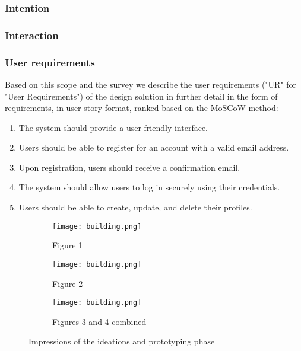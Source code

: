 \subsubsection{Intention}

\subsubsection{Interaction}

\subsubsection{User requirements}

Based on this scope and the survey we describe the user requirements ("UR" for "User Requirements") of the design solution in further detail in the form of requirements, in user story format, ranked based on the MoSCoW method:

\begin{enumerate}
    \renewcommand{\labelenumi}{UR\arabic{enumi}:}
    \item The system should provide a user-friendly interface.
    \item Users should be able to register for an account with a valid email address.
    \item Upon registration, users should receive a confirmation email.
    \item The system should allow users to log in securely using their credentials.
    \item Users should be able to create, update, and delete their profiles.
\end{enumerate}

\begin{figure*}[!t]
    \centering
    \begin{subfigure}[b]{0.23\textwidth}
        \texttt{[image: building.png]}
        \caption{Figure 1}
        \label{fig:1}
    \end{subfigure}
    \hfill
    \begin{subfigure}[b]{0.23\textwidth}
        \texttt{[image: building.png]}
        \caption{Figure 2}
        \label{fig:2}
    \end{subfigure}
    \hfill
    \begin{subfigure}[b]{0.5\textwidth}
        \texttt{[image: building.png]}
        \caption{Figures 3 and 4 combined}
        \label{fig:3_4_combined}
    \end{subfigure}
    \caption{Impressions of the ideations and prototyping phase}
    \label{fig:full_width}
\end{figure*}

